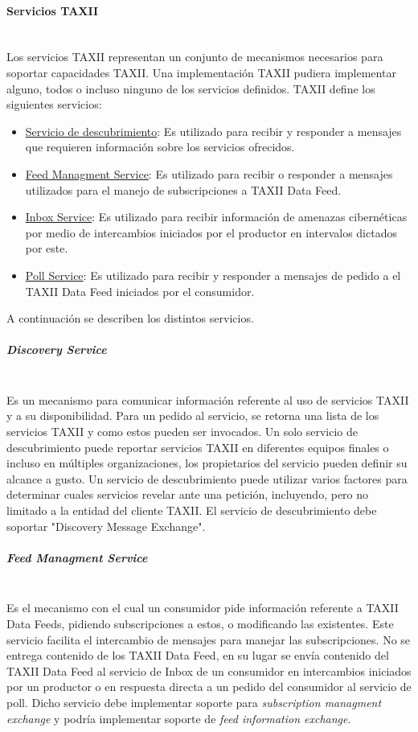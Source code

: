 \paragraph{Servicios TAXII}\ \\

Los servicios TAXII representan un conjunto de mecanismos necesarios para 
soportar capacidades TAXII. Una implementación TAXII pudiera implementar alguno, 
todos o incluso ninguno de los servicios definidos.
TAXII define los siguientes servicios:
\begin{itemize}
  \item \underline{Servicio de descubrimiento}: Es utilizado para recibir y responder a 
  mensajes que requieren información sobre los servicios ofrecidos.
  \item \underline{Feed Managment Service}: Es utilizado para recibir o responder a mensajes 
  utilizados para el manejo de subscripciones a TAXII Data Feed.
  \item \underline{Inbox Service}: Es utilizado para recibir información de amenazas 
  cibernéticas por medio de intercambios iniciados por el productor en intervalos 
  dictados por este.
  \item \underline{Poll Service}: Es utilizado para recibir y responder a mensajes de pedido 
  a el TAXII Data Feed iniciados por el consumidor.
\end{itemize}

A continuación se describen los distintos servicios.

\subparagraph{Discovery Service}\ \\

Es un mecanismo para comunicar información referente al uso de servicios TAXII y 
a su disponibilidad. Para un pedido al servicio, se retorna una lista de los 
servicios TAXII y como estos pueden ser invocados. Un solo servicio de 
descubrimiento puede reportar servicios TAXII en diferentes equipos finales o 
incluso en múltiples organizaciones, los propietarios del servicio pueden 
definir su alcance a gusto. Un servicio de descubrimiento puede utilizar 
varios factores para determinar cuales servicios revelar ante una petición, 
incluyendo, pero no limitado a la entidad del cliente TAXII.
El servicio de descubrimiento debe soportar "Discovery Message Exchange".

\subparagraph{Feed Managment Service}\ \\

Es el mecanismo con el cual un consumidor pide información referente a TAXII 
Data Feeds, pidiendo subscripciones a estos, o modificando las existentes. Este 
servicio facilita el intercambio de mensajes para manejar las subscripciones. 
No se entrega contenido de los TAXII Data Feed, en su lugar se envía 
contenido del TAXII Data Feed al servicio de Inbox de un consumidor en intercambios 
iniciados por un productor o en respuesta directa a un pedido del consumidor al 
servicio de poll.
Dicho servicio debe implementar soporte para \textit{subscription managment exchange} y podría implementar soporte de \textit{feed information exchange}.

